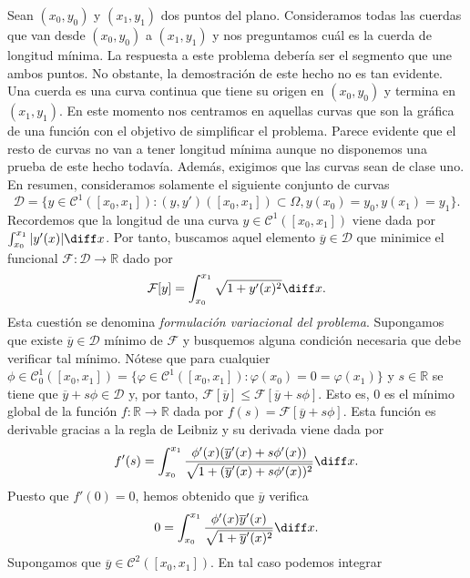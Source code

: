 \documentclass{article}
\begin{document}
\begin{ex} \label{ex:intro}
  Sean $(x_0, y_0)$ y $(x_1, y_1)$ dos puntos del plano. Consideramos todas las cuerdas que van
  desde $(x_0, y_0)$ a $(x_1, y_1)$ y nos preguntamos cuál es la cuerda de longitud mínima. La
  respuesta a este problema debería ser el segmento que une ambos puntos. No obstante, la
  demostración de este hecho no es tan evidente. Una cuerda es una curva continua que tiene su
  origen en $(x_0, y_0)$ y termina en $(x_1, y_1)$. En este momento nos centramos en aquellas curvas
  que son la gráfica de una función con el objetivo de simplificar el problema. Parece evidente que
  el resto de curvas no van a tener longitud mínima aunque no disponemos una prueba de este hecho
  todavía. Además, exigimos que las curvas sean de clase uno. En resumen, consideramos solamente el
  siguiente conjunto de curvas
  \[\mathcal{D} = \{y \in \mathcal{C}^1([x_0, x_1]): (y, y')([x_0, x_1]) \subset \Omega, y(x_0) =
    y_0, y(x_1) = y_1\}.\] Recordemos que la longitud de una curva $y \in \mathcal{C}^1([x_0, x_1])$
  viene dada por $\int_{x_0}^{x_1} |y'(x)| \diff x$. Por tanto, buscamos aquel elemento
  $\overline{y} \in \mathcal{D}$ que minimice el funcional $\mathcal{F}: \mathcal{D} \to \mathbb{R}$
  dado por
  \[\mathcal{F}[y] = \int_{x_0}^{x_1} \sqrt{1 + y'(x)^2} \diff x.\]
  Esta cuestión se denomina \emph{formulación variacional del problema}. Supongamos que existe
  $\overline{y} \in \mathcal{D}$ mínimo de $\mathcal{F}$ y busquemos alguna condición necesaria que
  debe verificar tal mínimo. Nótese que para cualquier
  $\phi \in \mathcal{C}^1_0([x_0, x_1]) = \{\varphi \in \mathcal{C}^1([x_0, x_1]): \varphi(x_0) = 0
  = \varphi(x_1)\}$ y $s \in \mathbb{R}$ se tiene que $\overline{y} + s \phi \in \mathcal{D}$ y, por
  tanto, $\mathcal{F}[\overline{y}] \le \mathcal{F}[\overline{y} + s \phi]$. Esto es, $0$ es el
  mínimo global de la función $f: \mathbb{R} \to \mathbb{R}$ dada por
  $f(s) = \mathcal{F}[\overline{y} + s \phi]$. Esta función es derivable gracias a la regla de
  Leibniz y su derivada viene dada por
  \[f'(s) = \int_{x_0}^{x_1} \frac{\phi'(x)(\overline{y}'(x) + s \phi'(x))}{\sqrt{1 +
        (\overline{y}'(x) + s \phi'(x))^2}} \diff x.\] Puesto que $f'(0) = 0$, hemos obtenido que
  $\overline{y}$ verifica
  \begin{equation} \label{eq:ex:fdp} 0 = \int_{x_0}^{x_1} \frac{\phi'(x) \overline{y}'(x)}{\sqrt{1 +
        \overline{y}'(x)^2}} \diff x.
  \end{equation}
  Supongamos que $\overline{y} \in \mathcal{C}^2([x_0, x_1])$. En tal caso podemos integrar

\end{ex}
\end{document}
